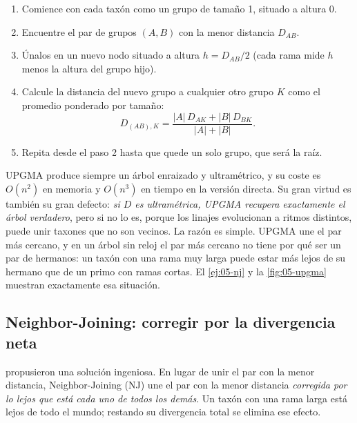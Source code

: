 \begin{enumerate}
  \item Comience con cada taxón como un grupo de tamaño 1, situado a altura 0.
  \item Encuentre el par de grupos $(A,B)$ con la menor distancia $D_{AB}$.
  \item Únalos en un nuevo nodo situado a altura $h=D_{AB}/2$ (cada rama mide $h$ menos la altura del grupo hijo).
  \item Calcule la distancia del nuevo grupo a cualquier otro grupo $K$ como el promedio ponderado por tamaño:
  \begin{equation}\label{eq:05-upgma}
  D_{(AB),K} = \frac{|A|\,D_{AK}+|B|\,D_{BK}}{|A|+|B|}.
  \end{equation}
  \item Repita desde el paso 2 hasta que quede un solo grupo, que será la raíz.
\end{enumerate}

\begin{simbolos}
\end{simbolos}

UPGMA produce siempre un árbol enraizado y ultramétrico, y su coste es $O(n^2)$ en memoria y $O(n^3)$ en tiempo en la versión directa. Su gran virtud es también su gran defecto: \emph{si $D$ es ultramétrica, UPGMA recupera exactamente el árbol verdadero}, pero si no lo es, porque los linajes evolucionan a ritmos distintos, puede unir taxones que no son vecinos. La razón es simple. UPGMA une el par más cercano, y en un árbol sin reloj el par más cercano no tiene por qué ser un par de hermanos: un taxón con una rama muy larga puede estar más lejos de su hermano que de un primo con ramas cortas. El \cref{ej:05-nj} y la \cref{fig:05-upgma} muestran exactamente esa situación.

\subsection{Neighbor-Joining: corregir por la divergencia neta}

\textcite{c05-saitou1987} propusieron una solución ingeniosa. En lugar de unir el par con la menor distancia, Neighbor-Joining (NJ) une el par con la menor distancia \emph{corregida por lo lejos que está cada uno de todos los demás}. Un taxón con una rama larga está lejos de todo el mundo; restando su divergencia total se elimina ese efecto.

